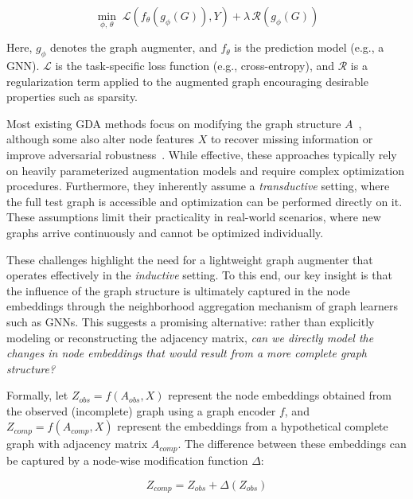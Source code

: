 \documentclass[letterpaper]{article} \usepackage{aaai2026}  \usepackage{times}  \usepackage{helvet}  \usepackage{courier}  \usepackage[hyphens]{url}  \usepackage{graphicx} \urlstyle{rm} \def\UrlFont{\rm}  \usepackage{natbib}  \usepackage{caption} \frenchspacing  \setlength{\pdfpagewidth}{8.5in}  \setlength{\pdfpageheight}{11in}
\begin{document}
\begin{equation} \label{eq:gda_general_reg_output}
\min_{\phi,\, \theta} \; \mathcal{L}(f_{\theta}(g_{\phi}(G)), Y) + \lambda \, \mathcal{R}(g_{\phi}(G))
\end{equation}

Here, $g_{\phi}$ denotes the graph augmenter, and $f_{\theta}$ is the prediction model (e.g., a GNN). $\mathcal{L}$ is the task-specific loss function (e.g., cross-entropy), and $\mathcal{R}$ is a regularization term applied to the augmented graph encouraging desirable properties such as sparsity.

Most existing GDA methods focus on modifying the graph structure \( A\)~\cite{fatemi2021slaps, franceschi2019learning, chen2020iterative, yu2021graph, zhao2023graphglow, liu2022towards}, although some also alter node features \( X\) to recover missing information or improve adversarial robustness~\cite{chen2020learning, liu2021graph, jin2020graph}. While effective, these approaches typically rely on heavily parameterized augmentation models and require complex optimization procedures. Furthermore, they inherently assume a \textit{transductive} setting, where the full test graph is accessible and optimization can be performed directly on it. These assumptions limit their practicality in real-world scenarios, where new graphs arrive continuously and cannot be optimized individually.

These challenges highlight the need for a lightweight graph augmenter that operates effectively in the \textit{inductive} setting. To this end, our key insight is that the influence of the graph structure is ultimately captured in the node embeddings through the neighborhood aggregation mechanism of graph learners such as GNNs. This suggests a promising alternative: rather than explicitly modeling or reconstructing the adjacency matrix, \textit{can we directly model the changes in node embeddings that would result from a more complete graph structure?}

Formally, let $Z_{obs} = f(A_{obs}, X)$ represent the node embeddings obtained from the observed (incomplete) graph using a graph encoder $f$, and $Z_{comp} = f(A_{comp}, X)$ represent the embeddings from a hypothetical complete graph with adjacency matrix $A_{comp}$. The difference between these embeddings can be captured by a node-wise modification function $\Delta$:

\begin{equation}
Z_{comp} = Z_{obs} + \Delta(Z_{obs})
\end{equation}
\end{document}
